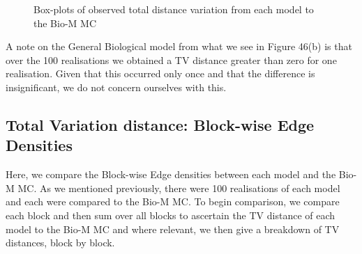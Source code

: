 \begin{figure}[H]%
    \centering
    \captionsetup{justification=centering}
    \qquad
    \caption{Box-plots of observed total distance variation from each model to the Bio-M MC}%
    \label{fig:example}%
\end{figure}
A note on the General Biological model from what we see in Figure 46(b) is that over the 100 realisations we obtained a TV distance greater than zero for one realisation. Given that this occurred only once and that the difference is insignificant, we do not concern ourselves with this. 

\subsection{Total Variation distance: Block-wise Edge Densities}
Here, we compare the Block-wise Edge densities between each model and the Bio-M MC. As we mentioned previously, there were 100 realisations of each model and each were compared to the Bio-M MC. To begin comparison, we compare each block and then sum over all blocks to ascertain the TV distance of each model to the Bio-M MC and where relevant, we then give a breakdown of TV distances, block by block.  


